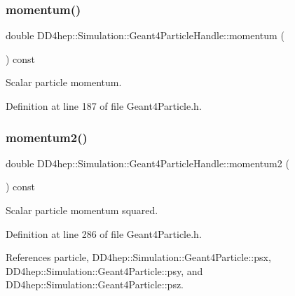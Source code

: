 \subsubsection{\texorpdfstring{momentum()}{momentum()}}
{\footnotesize\ttfamily double D\+D4hep\+::\+Simulation\+::\+Geant4\+Particle\+Handle\+::momentum (\begin{DoxyParamCaption}{ }\end{DoxyParamCaption}) const\hspace{0.3cm}{\ttfamily [inline]}}



Scalar particle momentum. 



Definition at line 187 of file Geant4\+Particle.\+h.

\hypertarget{class_d_d4hep_1_1_simulation_1_1_geant4_particle_handle_a51181874cfc7d9a6d92ae0ea029b99a8}{}\label{class_d_d4hep_1_1_simulation_1_1_geant4_particle_handle_a51181874cfc7d9a6d92ae0ea029b99a8} 
\subsubsection{\texorpdfstring{momentum2()}{momentum2()}}
{\footnotesize\ttfamily double D\+D4hep\+::\+Simulation\+::\+Geant4\+Particle\+Handle\+::momentum2 (\begin{DoxyParamCaption}{ }\end{DoxyParamCaption}) const\hspace{0.3cm}{\ttfamily [inline]}}



Scalar particle momentum squared. 



Definition at line 286 of file Geant4\+Particle.\+h.



References particle, D\+D4hep\+::\+Simulation\+::\+Geant4\+Particle\+::psx, D\+D4hep\+::\+Simulation\+::\+Geant4\+Particle\+::psy, and D\+D4hep\+::\+Simulation\+::\+Geant4\+Particle\+::psz.

\hypertarget{class_d_d4hep_1_1_simulation_1_1_geant4_particle_handle_ac9eb570d22b96ba8680ff58a5168fe56}{}\label{class_d_d4hep_1_1_simulation_1_1_geant4_particle_handle_ac9eb570d22b96ba8680ff58a5168fe56} 
